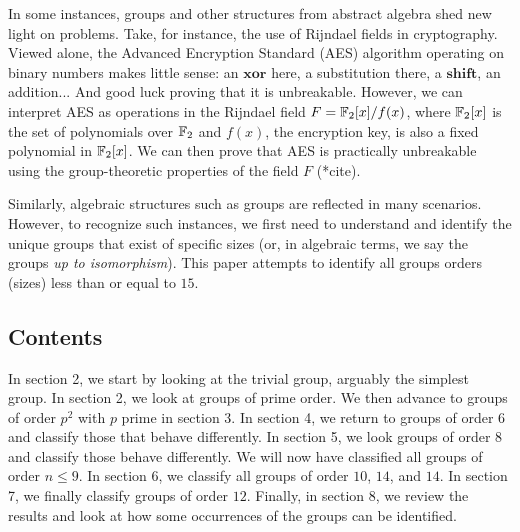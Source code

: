 In some instances, groups and other structures from abstract algebra
shed new light on problems.
Take, for instance, the use of Rijndael fields in cryptography.
Viewed alone, the Advanced Encryption Standard (AES) algorithm
operating on binary numbers makes little sense:
an $\mathbf{xor}$ here, a substitution there, a $\mathbf{shift}$,
an addition... And good luck proving that it is unbreakable.
However, we can interpret AES as operations in the Rijndael field
$F = \mathbb{F}_2[x]/f(x)$, where $\mathbb{F}_2[x]$ is the set of polynomials over $\mathbb{F}_2$
and $f(x)$, the encryption key, is also a fixed polynomial in $\mathbb{F}_2[x]$.
We can then prove that AES is practically unbreakable 
using the group-theoretic properties of the field $F$ (*cite).

Similarly, algebraic structures such as groups are reflected in many scenarios.
However, to recognize such instances, we first need to understand
and identify the unique groups that exist of specific sizes
(or, in algebraic terms, we say the groups \emph{up to isomorphism}).
This paper attempts to identify all groups orders (sizes) less than or equal to $15$.

\subsection*{Contents}
In section 2, we start by looking at the trivial group, arguably the simplest group.
In section 2, we look at groups of prime order.
We then advance to groups of order $p^2$ with $p$ prime in section 3.
In section 4, we return to groups of order $6$ and classify those that behave differently.
In section 5, we look groups of order $8$ and classify those behave differently.
We will now have classified all groups of order $n \le 9$.
In section 6, we classify all groups of order $10$, $14$, and $14$.
In section 7, we finally classify groups of order $12$.
Finally, in section 8, we review the results and look at how
some occurrences of the groups can be identified.
